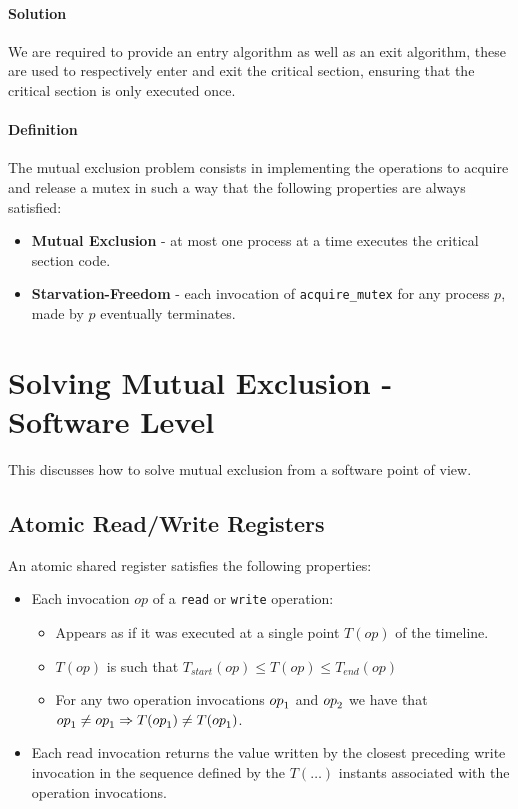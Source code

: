 \paragraph{Solution}
We are required to provide an entry algorithm as well as an exit algorithm,
these are used to respectively enter and exit the critical section,
ensuring that the critical section is only executed once.

\paragraph{Definition}
The mutual exclusion problem consists in implementing the operations to acquire and release a mutex
in such a way that the following properties are always satisfied:

\begin{itemize}
    \item \textbf{Mutual Exclusion} - at most one process at a time executes the critical section code.
    \item \textbf{Starvation-Freedom} - each invocation of \texttt{acquire\_mutex} for any process $p$, made by $p$ eventually terminates.
\end{itemize}

\section{Solving Mutual Exclusion - Software Level}

This discusses how to solve mutual exclusion from a software point of view.

\subsection{Atomic Read/Write Registers}

An atomic shared register satisfies the following properties:
\begin{itemize}
    \item Each invocation $op$ of a \texttt{read} or \texttt{write} operation:
    \begin{itemize}
        \item Appears as if it was executed at a single point $T(op)$ of the timeline.
        \item $T(op)$ is such that $T_{start}(op) \le T(op) \le T_{end}(op)$
        \item For any two operation invocations $\mathnormal{op}_1$ and $\mathnormal{op}_2$ we have that
        $\mathnormal{op}_1 \neq \mathnormal{op}_1 \Rightarrow T(\mathnormal{op}_1) \neq T(\mathnormal{op}_1)$.
    \end{itemize}
    \item Each read invocation returns the value written by the closest preceding write invocation in the sequence defined by the $T(\dots)$ instants associated with the operation invocations.
\end{itemize}

